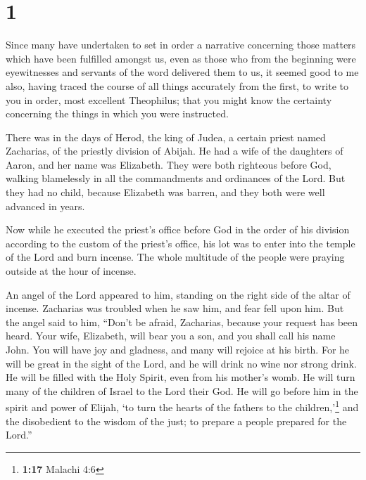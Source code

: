 \hypertarget{section}{%
\section{1}\label{section}}

 Since many have undertaken to set in order a narrative
concerning those matters which have been fulfilled amongst us,
 even as those who from the beginning were eyewitnesses
and servants of the word delivered them to us,  it seemed
good to me also, having traced the course of all things accurately from
the first, to write to you in order, most excellent Theophilus;
 that you might know the certainty concerning the things
in which you were instructed.

 There was in the days of Herod, the king of Judea, a
certain priest named Zacharias, of the priestly division of Abijah. He
had a wife of the daughters of Aaron, and her name was Elizabeth.
 They were both righteous before God, walking blamelessly
in all the commandments and ordinances of the Lord.  But
they had no child, because Elizabeth was barren, and they both were well
advanced in years.

 Now while he executed the priest's office before God in
the order of his division  according to the custom of the
priest's office, his lot was to enter into the temple of the Lord and
burn incense.  The whole multitude of the people were
praying outside at the hour of incense.

 An angel of the Lord appeared to him, standing on the
right side of the altar of incense.  Zacharias was
troubled when he saw him, and fear fell upon him.  But
the angel said to him, ``Don't be afraid, Zacharias, because your
request has been heard. Your wife, Elizabeth, will bear you a son, and
you shall call his name John.  You will have joy and
gladness, and many will rejoice at his birth.  For he
will be great in the sight of the Lord, and he will drink no wine nor
strong drink. He will be filled with the Holy Spirit, even from his
mother's womb.  He will turn many of the children of
Israel to the Lord their God.  He will go before him in
the spirit and power of Elijah, `to turn the hearts of the fathers to
the children,'\footnote{\textbf{1:17} Malachi 4:6} and the disobedient
to the wisdom of the just; to prepare a people prepared for the Lord.''

